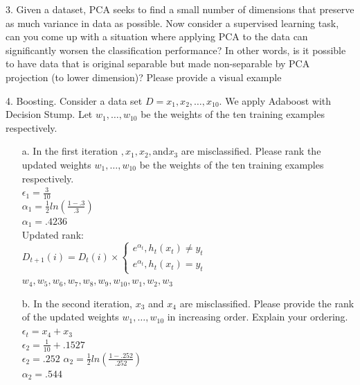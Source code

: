 \documentclass[12pt,letterpaper]{article}
\begin{document}
	\pagebreak
	\item[3.] Given a dataset, PCA seeks to find a small number of dimensions that preserve as much variance in data as possible. Now consider a supervised learning task, can you come up with a situation where applying PCA to the data can significantly worsen the classification performance? In other words, is it possible to have data that is original separable but made non-separable by PCA projection (to lower dimension)? Please provide a visual example \\
\pagebreak	
	\item[4.] Boosting. Consider a data set $D = {x_{1},x_{2},\ldots,x_{10}}$. We apply Adaboost with Decision Stump. Let $w_{1}, \ldots, w_{10}$ be the weights of the ten training examples respectively. \\
	\begin{enumerate}
		\item[a.] In the first iteration $, x_{1}, x_{2},$and$ x_{3}$ are misclassified. Please rank the updated weights $w_{1}, \ldots, w_{10}$ be the weights of the ten training examples respectively. \\
		$\epsilon_{1} = \frac{3}{10}$ \\
		$\alpha_{1} = \frac{1}{2} ln (\frac{1 - .3}{.3})$ \\
		$\alpha_{1} = .4236$ \\
		
		Updated rank: \\ 
			
		$D_{t+1}(i) = D_{t}(i) \times \begin{cases} e^{\alpha_{t}}, h_{t}(x_{t}) \neq y_{t} \\ e^{\alpha_{t}}, h_{t}(x_{t}) = y_{t} \end{cases}$ \\[10mm]
		

		$w_{4}, w_{5}, w_{6}, w_{7}, w_{8}, w_{9}, w_{10}, w_{1}, w_{2}, w_{3}$ \\
			
		\item[b.] In the second iteration, $x_{3}$ and $x_{4}$ are misclassified. Please provide the rank of the updated weights $w_{1}, \ldots, w_{10}$ in increasing order. Explain your ordering. \\
		
		$\epsilon_{t} = x_{4} + x_{3} $ \\
		$\epsilon_{2} = \frac{1}{10} + .1527 $ \\
		$\epsilon_{2} = .252$ 
		$\alpha_{2} = \frac{1}{2} ln (\frac{1 - .252}{.252})$ \\
		$\alpha_{2} = .544$ \\
		

\end{enumerate}
\end{document}
